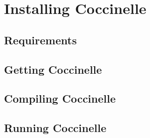 \chapter{Installing Coccinelle}

\section{Requirements}

\section{Getting Coccinelle}

\section{Compiling Coccinelle}

\section{Running Coccinelle}

